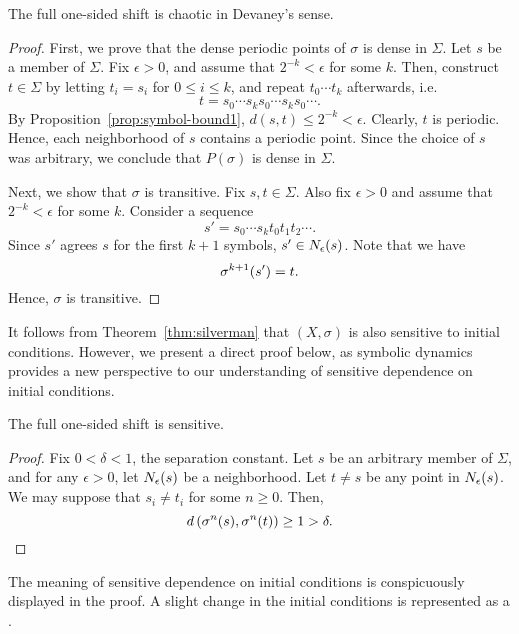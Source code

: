 \documentclass[10pt,twoside]{book}
\begin{document}
\begin{theorem}
  The full one-sided shift is chaotic in Devaney's sense.
  \begin{proof}
    First, we prove that the dense periodic points of $\sigma$ is dense in $\Sigma$.
    Let $s$ be a member of $\Sigma$.
    Fix $\epsilon > 0$, and assume that $2^{-k} < \epsilon$ for some $k$.
    Then, construct $t \in \Sigma$ by letting $t_i = s_i$ for $0 \leq i \leq k$, and repeat $t_0 \cdots t_k$ afterwards, i.e.
    \begin{equation*}
      t = s_0 \cdots s_k s_0 \cdots s_k s_0 \cdots.
    \end{equation*}
    By Proposition~\ref{prop:symbol-bound1}, $d(s,t) \leq 2^{-k} < \epsilon$.
    Clearly, $t$ is periodic.
    Hence, each neighborhood of $s$ contains a periodic point.
    Since the choice of $s$ was arbitrary, we conclude that $P(\sigma)$ is dense in $\Sigma$.

    Next, we show that $\sigma$ is transitive.
    Fix $s,t \in \Sigma$.
    Also fix $\epsilon > 0$ and assume that $2^{-k} < \epsilon$ for some $k$.
    Consider a sequence
    \begin{equation*}
      s' = s_0 \cdots s_k t_0 t_1 t_2 \cdots.
    \end{equation*}
    Since $s'$ agrees $s$ for the first $k+1$ symbols, $s' \in N_{\epsilon}(s)$.
    Note that we have
    \begin{equation*}
      \sigma^{k+1}(s') = t.
    \end{equation*}
    Hence, $\sigma$ is transitive.
  \end{proof}
\end{theorem}
It follows from Theorem~\ref{thm:silverman} that $(X, \sigma)$ is also sensitive to initial conditions.
However, we present a direct proof below, as symbolic dynamics provides a new perspective to our understanding of sensitive dependence on initial conditions.
\begin{proposition}
  The full one-sided shift is sensitive.
  \begin{proof}
    Fix $0 < \delta < 1$, the separation constant.
    Let $s$ be an arbitrary member of $\Sigma$, and for any $\epsilon > 0$, let $N_{\epsilon}(s)$ be a neighborhood.
    Let $t \neq s$ be any point in $N_{\epsilon}(s)$.
    We may suppose that $s_i \neq t_i$ for some $n \geq 0$.
    Then,
    \begin{equation*}
      d\left( \sigma^{n}(s), \sigma^{n}(t) \right) \geq 1 > \delta.
    \end{equation*}
  \end{proof}
\end{proposition}
The meaning of sensitive dependence on initial conditions is conspicuously displayed in the proof.
A slight change in the initial conditions is represented as a .
\end{document}
